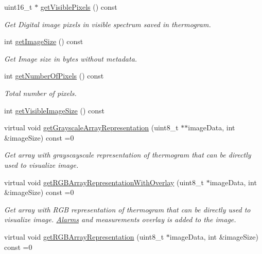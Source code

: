 \begin{DoxyCompactItemize}
uint16\+\_\+t $\ast$ \hyperlink{classwtl_1_1_thermal_image_aae3499c4b035ce32972c35cbaea366eb}{get\+Visible\+Pixels} () const
\begin{DoxyCompactList}\small\item\em Get Digital image pixels in visible spectrum saved in thermogram. \end{DoxyCompactList}\item 
int \hyperlink{classwtl_1_1_thermal_image_aef736a8394a7899e696f4dcf991139ea}{get\+Image\+Size} () const
\begin{DoxyCompactList}\small\item\em Get Image size in bytes without metadata. \end{DoxyCompactList}\item 
int \hyperlink{classwtl_1_1_thermal_image_aa1a417dd0315dca5ecc14fb49e05cfc2}{get\+Number\+Of\+Pixels} () const
\begin{DoxyCompactList}\small\item\em Total number of pixels. \end{DoxyCompactList}\item 
int \hyperlink{classwtl_1_1_thermal_image_a443379442ee5ab8894138f14376d3380}{get\+Visible\+Image\+Size} () const
\item 
virtual void \hyperlink{classwtl_1_1_thermal_image_ad43f8aa46870634ad5cdd5dd784046fc}{get\+Grayscale\+Array\+Representation} (uint8\+\_\+t $\ast$$\ast$image\+Data, int \&image\+Size) const =0
\begin{DoxyCompactList}\small\item\em Get array with grayscayscale representation of thermogram that can be directly used to visualize image. \end{DoxyCompactList}\item 
virtual void \hyperlink{classwtl_1_1_thermal_image_a02a4771bd8c9e571d195fe86b7b856f2}{get\+R\+G\+B\+Array\+Representation\+With\+Overlay} (uint8\+\_\+t $\ast$image\+Data, int \&image\+Size) const =0
\begin{DoxyCompactList}\small\item\em Get array with R\+GB representation of thermogram that can be directly used to visualize image. \hyperlink{classwtl_1_1_alarms}{Alarms} and measurements overlay is added to the image. \end{DoxyCompactList}\item 
virtual void \hyperlink{classwtl_1_1_thermal_image_ae19943330497206817cda3557c4a0725}{get\+R\+G\+B\+Array\+Representation} (uint8\+\_\+t $\ast$image\+Data, int \&image\+Size) const =0
$$
\end{DoxyCompactItemize}
